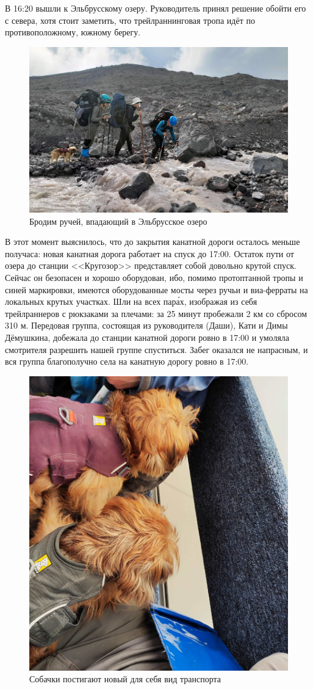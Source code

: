 В 16:20 вышли к Эльбрусскому озеру. Руководитель принял решение обойти его с севера, хотя стоит заметить, что трейлраннинговая тропа идёт по противоположному, южному берегу.

\begin{figure}[h!]
	\centering
	\includegraphics[width=0.7\linewidth]{../pics/20240830_162252.jpg}
	\caption{Бродим ручей, впадающий в Эльбрусское озеро}
	\label{fig:20240830_162252.jpg}
\end{figure}

В этот момент выяснилось, что до закрытия канатной дороги осталось меньше получаса: новая канатная дорога работает на спуск до 17:00. Остаток пути от озера до станции <<Кругозор>> представляет собой довольно крутой спуск. Сейчас он безопасен и хорошо оборудован, ибо, помимо протоптанной тропы и синей маркировки, имеются оборудованные мосты через ручьи и виа-ферраты на локальных крутых участках. Шли на всех пар\'{а}х, изображая из себя трейлраннеров с рюкзаками за плечами: за 25 минут пробежали 2 км со сбросом 310 м. Передовая группа, состоящая из руководителя (Даши), Кати и Димы Дёмушкина, добежала до станции канатной дороги ровно в 17:00 и умоляла смотрителя разрешить нашей группе спуститься. Забег оказался не напрасным, и вся группа благополучно села на канатную дорогу ровно в 17:00. 

\begin{figure}[h!]
	\centering
	\includegraphics[width=0.35\linewidth]{../pics/IMG_20240830_170232.jpg}
	\caption{Собачки постигают новый для себя вид транспорта}
	\label{fig:IMG_20240830_170232.jpg}
\end{figure}


